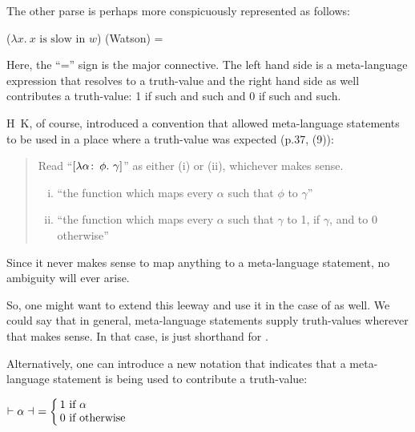 The other parse is perhaps more conspicuously represented as follows:

\ex ($\lambda x.\ x \mbox{ is slow in } w$) (Watson) =  \xe

Here, the ``='' sign is the major connective. The left hand side is a
meta-language expression that resolves to a truth-value and the right hand
side %
%
as well contributes a truth-value: 1 if such and such and 0 if such and such.

H\amp\ K, of course, introduced a convention that allowed meta-language
statements to be used in a place where a truth-value was expected (p.37, (9)):

\begin{quote}
  Read ``$[\lambda \alpha\co \phi.\ \gamma]$'' as either (i) or (ii),
  whichever makes sense.
  \begin{enumerate}[(i)]
  \item ``the function which maps every $\alpha$ such that $\phi$ to
    $\gamma$''
  \item ``the function which maps every $\alpha$ such that $\gamma$ to
    1, if $\gamma$, and to 0 otherwise''
  \end{enumerate}
\end{quote}
%
Since it never makes sense to map anything to a meta-language statement, no
ambiguity will ever arise.

So, %
%
one might want to extend this leeway and use it in the case of
 as well. We could say that in general, meta-language
statements supply truth-values wherever that makes sense. In that case,
 is just shorthand for .

\newcommand{\nupsis}[1]{\ensuremath{\vdash #1 \dashv}}

Alternatively, %
%
one can introduce a new notation that indicates that a meta-language statement
is being used to contribute a truth-value:

\ex $\nupsis{\alpha}\ = \leftchoice{1 if $\alpha$,0 if otherwise}$ \xe

